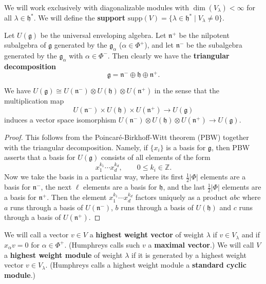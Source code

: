 \documentclass[12pt]{article}
\begin{document}
We will work exclusively with diagonalizable modules with $\dim(V_\lambda) < \infty$ for all $\lambda \in \mathfrak{h}^*$. We will define the \textbf{support} $\mathrm{supp}(V) = \{ \lambda \in \mathfrak{h}^* \mid V_\lambda \neq 0 \}$.

Let $U(\mathfrak{g})$ be the universal enveloping algebra. Let $\mathfrak{n}^+$ be the nilpotent subalgebra of $\mathfrak{g}$ generated by the $\mathfrak{g}_\alpha$ ($\alpha \in \Phi^+$), and let $\mathfrak{n}^-$ be the subalgebra generated by the $\mathfrak{g}_\alpha$ with $\alpha \in \Phi^-$. Then clearly we have the \textbf{triangular decomposition}
\[
    \mathfrak{g} = \mathfrak{n}^- \oplus \mathfrak{h} \oplus \mathfrak{n}^+.
\]

\begin{lemma}
    We have $U(\mathfrak{g}) \cong U(\mathfrak{n}^-) \otimes U(\mathfrak{h}) \otimes U(\mathfrak{n}^+)$ in the sense that the multiplication map
    \[
        U(\mathfrak{n}^-) \times U(\mathfrak{h}) \times U(\mathfrak{n}^+) \longrightarrow U(\mathfrak{g})
    \]
    induces a vector space isomorphism $U(\mathfrak{n}^-) \otimes U(\mathfrak{h}) \otimes U(\mathfrak{n}^+) \longrightarrow U(\mathfrak{g})$.
\end{lemma}

\begin{proof}
    This follows from the Poincaré-Birkhoff-Witt theorem (PBW) together with the triangular decomposition. Namely, if $\{x_i\}$ is a basis for $\mathfrak{g}$, then PBW asserts that a basis for $U(\mathfrak{g})$ consists of all elements of the form
    \[
        x_1^{k_1} \cdots x_d^{k_d}, \qquad 0 \leq k_i \in \mathbb{Z}.
    \]
    Now we take the basis in a particular way, where its first $\tfrac{1}{2}|\Phi|$ elements are a basis for $\mathfrak{n}^-$, the next $\ell$ elements are a basis for $\mathfrak{h}$, and the last $\tfrac{1}{2}|\Phi|$ elements are a basis for $\mathfrak{n}^+$. Then the element $x_1^{k_1}\cdots x_d^{k_d}$ factors uniquely as a product $abc$ where $a$ runs through a basis of $U(\mathfrak{n}^-)$, $b$ runs through a basis of $U(\mathfrak{h})$ and $c$ runs through a basis of $U(\mathfrak{n}^+)$.
\end{proof}

We will call a vector $v \in V$ a \textbf{highest weight vector} of weight $\lambda$ if $v \in V_\lambda$ and if $x_\alpha v = 0$ for $\alpha \in \Phi^+$. (Humphreys calls such $v$ a \textbf{maximal vector}.) We will call $V$ a \textbf{highest weight module} of weight $\lambda$ if it is generated by a highest weight vector $v \in V_\lambda$. (Humphreys calls a highest weight module a \textbf{standard cyclic module}.)
\end{document}
